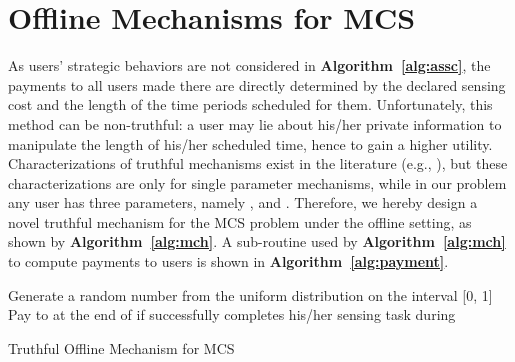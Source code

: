 \documentclass[10pt,journal,compsoc]{IEEEtran}
\begin{document}
\section{Offline Mechanisms for MCS} \label{sec:offline}
As users' strategic behaviors are not considered in \textbf{Algorithm~\ref{alg:assc}}, the payments to all users made there are directly determined by the declared sensing cost and the length of the time periods scheduled for them. Unfortunately, this method can be non-truthful: a user may lie about his/her private information to manipulate the length of his/her scheduled time, hence to gain a higher utility. Characterizations of truthful mechanisms exist in the literature (e.g., \cite{Myerson1981,Archer2001}), but these characterizations are only for single parameter mechanisms, while in our problem any user  has three parameters, namely ,  and . Therefore, we hereby design a novel truthful mechanism for the MCS problem under the offline setting, as shown by \textbf{Algorithm~\ref{alg:mch}}. A sub-routine used by \textbf{Algorithm~\ref{alg:mch}} to compute payments to users is shown in \textbf{Algorithm~\ref{alg:payment}}.
\begin{algorithm}[h!]
Generate a random number  from the uniform distribution on the interval [0, 1]~\\
    \If{}{
 \label{ln:callassc}~\\
\ForAll{} {
             \label{ln:callpay}~\\
        }
        \lForAll{}{
             \label{ln:endcal}
        }
}
    Pay  to  at the end of  if  successfully completes his/her sensing task during  \label{ln:postpaid}\\
    \Return{}
\caption{Truthful Offline Mechanism for MCS}
    \label{alg:mch}
  \end{algorithm}
\end{document}
